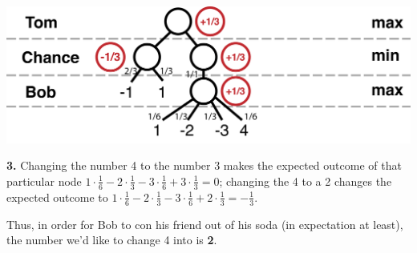 \documentclass[11pt]{article}
\begin{document}
\begin{center}
\includegraphics[scale=0.5]{stoc.png}
\end{center}

\textbf{3.} Changing the number 4 to the number 3 makes the expected outcome of that particular node $1 \cdot \frac{1}{6} -2 \cdot \frac{1}{3} - 3 \cdot \frac{1}{6} + 3 \cdot \frac{1}{3} = 0$; changing the 4 to a 2 changes the expected outcome to $1 \cdot \frac{1}{6} -2 \cdot \frac{1}{3} - 3 \cdot \frac{1}{6} + 2 \cdot \frac{1}{3} = - \frac{1}{3}$.

Thus, in order for Bob to con his friend out of his soda (in expectation at least), the number we'd like to change 4 into is \textbf{2}.
\end{document}

